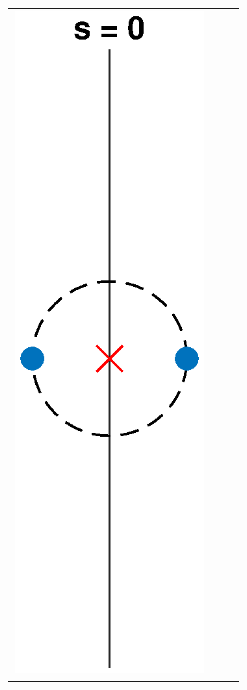 \documentclass[thesis.tex]{subfiles}
\begin{document}
\begin{figure}
\begin{center}
\begin{tabular}{ccc}
\includegraphics[width=5cm]{images/kreinbubbles/bubble0} &

\end{tabular}
\end{center}
\end{figure}
\end{document}
